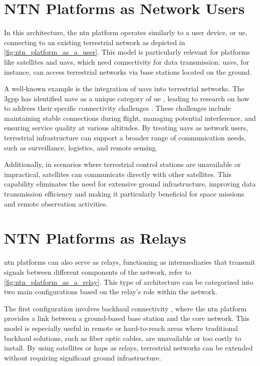 \section{NTN Platforms as Network Users}\label{sec:ntn_platform_as_a_user}

In this architecture, the \gls{ntn} platform operates similarly to a user device, or \gls{ue}, connecting to an existing terrestrial network as depicted in \cref{fig:ntn_platform_as_a_user}. This model is particularly relevant for platforms like satellites and \glspl{uav}, which need connectivity for data transmission. \glspl{uav}, for instance, can access terrestrial networks via base stations located on the ground.

A well-known example is the integration of \glspl{uav} into terrestrial networks. The \gls{3gpp} has identified \glspl{uav} as a unique category of \gls{ue} \autocite{muruganathan2019overview3gpprelease15study}, leading to research on how to address their specific connectivity challenges \autocite{uav_assisted_networks_challenges}. These challenges include maintaining stable connections during flight, managing potential interference, and ensuring service quality at various altitudes. By treating \glspl{uav} as network users, terrestrial infrastructure can support a broader range of communication needs, such as surveillance, logistics, and remote sensing.

Additionally, in scenarios where terrestrial control stations are unavailable or impractical, satellites can communicate directly with other satellites. This capability eliminates the need for extensive ground infrastructure, improving data transmission efficiency and making it particularly beneficial for space missions and remote observation activities.

\section{NTN Platforms as Relays}\label{sec:ntn_platform_as_a_relay}

\gls{ntn} platforms can also serve as relays, functioning as intermediaries that transmit signals between different components of the network, refer to \cref{fig:ntn_platform_as_a_relay}. This type of architecture can be categorized into two main configurations based on the relay's role within the network.

The first configuration involves backhaul connectivity \autocite{Elamassie2023FreeSO}, where the \gls{ntn} platform provides a link between a ground-based base station and the core network. This model is especially useful in remote or hard-to-reach areas where traditional backhaul solutions, such as fiber optic cables, are unavailable or too costly to install. By using satellites or \glspl{hap} as relays, terrestrial networks can be extended without requiring significant ground infrastructure.


